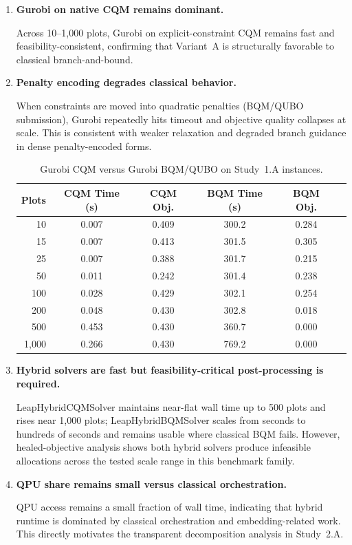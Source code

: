 \documentclass{oqireport}
\begin{document}
\begin{enumerate}[label=\textbf{Result \arabic*.}, leftmargin=*, align=left, itemsep=1em]

\item \textbf{Gurobi on native CQM remains dominant.}

Across 10--1{,}000 plots, Gurobi on explicit-constraint CQM remains fast and feasibility-consistent, confirming that Variant~A is structurally favorable to classical branch-and-bound.

\item \textbf{Penalty encoding degrades classical behavior.}

When constraints are moved into quadratic penalties (BQM/QUBO submission), Gurobi repeatedly hits timeout and objective quality collapses at scale. This is consistent with weaker relaxation and degraded branch guidance in dense penalty-encoded forms.

\begin{table}[H]
\centering
\caption{Gurobi CQM versus Gurobi BQM/QUBO on Study~1.A instances.}
\label{tab:gurobi_qubo_degradation}
\begin{tabular}{rccccc}
\toprule
\textbf{Plots} & \textbf{CQM Time (s)} & \textbf{CQM Obj.} & \textbf{BQM Time (s)} & \textbf{BQM Obj.} \\
\midrule
10 & 0.007 & 0.409 & 300.2 & 0.284     \\
15 & 0.007 & 0.413 & 301.5 & 0.305     \\
25 & 0.007 & 0.388 & 301.7 & 0.215     \\
50 & 0.011 & 0.242 & 301.4 & 0.238     \\
100 & 0.028 & 0.429 & 302.1 & 0.254    \\
200 & 0.048 & 0.430 & 302.8 & 0.018    \\
500 & 0.453 & 0.430 & 360.7 & 0.000    \\
1,000 & 0.266 & 0.430 & 769.2 & 0.000  \\
\bottomrule
\end{tabular}
\end{table}

\item \textbf{Hybrid solvers are fast but feasibility-critical post-processing is required.}

LeapHybridCQMSolver maintains near-flat wall time up to 500 plots and rises near 1{,}000 plots; LeapHybridBQMSolver scales from seconds to hundreds of seconds and remains usable where classical BQM fails. However, healed-objective analysis shows both hybrid solvers produce infeasible allocations across the tested scale range in this benchmark family.

\item \textbf{QPU share remains small versus classical orchestration.}

QPU access remains a small fraction of wall time, indicating that hybrid runtime is dominated by classical orchestration and embedding-related work. This directly motivates the transparent decomposition analysis in Study~2.A.

\end{enumerate}
\end{document}
